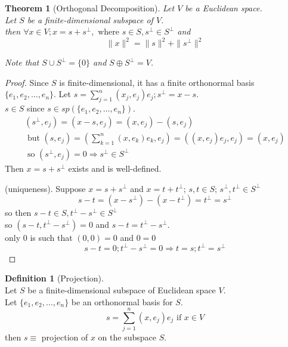 \documentclass[twoside]{amsart}
\theoremstyle{plain}
\newtheorem{theorem}{Theorem}
\theoremstyle{definition}
\newtheorem{definition}{Definition}
\begin{document}
\begin{theorem}[Orthogonal Decomposition]\label{T:Orthogonal_Decomposition}
  Let $V$ be a Euclidean space.  \\
  Let $S$ be a finite-dimensional subspace of $V$. \\  
  \phantom{Le} then $\forall x \in V; x = s + s^{\perp}, \text{ where } s \in S, s^{\perp} \in S^{\perp}$ and \\
  \begin{equation}
    \| x \|^2 = \| s \|^2 + \| s^{\perp} \|^2
  \end{equation}

Note that $S \cup S^{\perp} = \{ 0 \}$ and $ S \oplus  S^{\perp} = V$.  
\end{theorem}
\begin{proof}
  Since $S$ is finite-dimensional, it has a finite orthonormal basis $\{ e_1, e_2, \dots , e_n \}$.  
  Let $s = \sum_{j=1}^n (x_j , e_j )e_j ; s^{\perp} = x -s $.  \\
  \phantom{Let} $s \in S$ since $s \in sp(\{e_1, e_2, \dots, e_n \} )$.  
  \begin{gather*}
    (s^{\perp},e_j) = (x-s, e_j) = (x,e_j) - (s,e_j) \\
    \text{ but } (s, e_j) = (\sum_{k=1}^n (x,e_k)e_k, e_j) = ((x,e_j)e_j, e_j) = (x,e_j) \\
    \text{ so } (s^{\perp},e_j) = 0 \Longrightarrow s^{\perp} \in S^{\perp}
  \end{gather*}
  Then $x = s+s^{\perp}$ exists and is well-defined.
  
  (uniqueness). Suppose $x=s+s^{\perp}$ and $x = t+t^{\perp}$; $s,t \in S$; $s^{\perp}, t^{\perp} \in S^{\perp} $\\
  \[
  s-t = (x- s^{\perp} ) - (x-t^{\perp}) = t^{\perp} = s^{\perp}
  \]
  so then $s-t \in S, t^{\perp} - s^{\perp} \in S^{\perp} $ \\
  so $(s-t,t^{\perp} - s^{\perp}) = 0 $ and $s-t = t^{\perp} - s^{\perp}$.  \\
  only $0$ is such that $(0,0) = 0$ and $0=0$ 
  \[
  s- t =0; t^{\perp} - s^{\perp} =0 \Longrightarrow t = s; t^{\perp} = s^{\perp}
  \]
\end{proof}

\begin{definition}[Projection] \quad \\
  Let $S$ be a finite-dimensional subspace of Euclidean space $V$. \\
  Let $\{ e_1, e_2, \dots , e_n \} $ be an orthonormal basis for $S$.  
  \begin{equation}
    s = \sum_{j=1}^n (x,e_j) e_j \text{ if } x \in V
  \end{equation}
then $s \equiv$ projection of $x$ on the subspace $S$.  
\end{definition}
\end{document}
